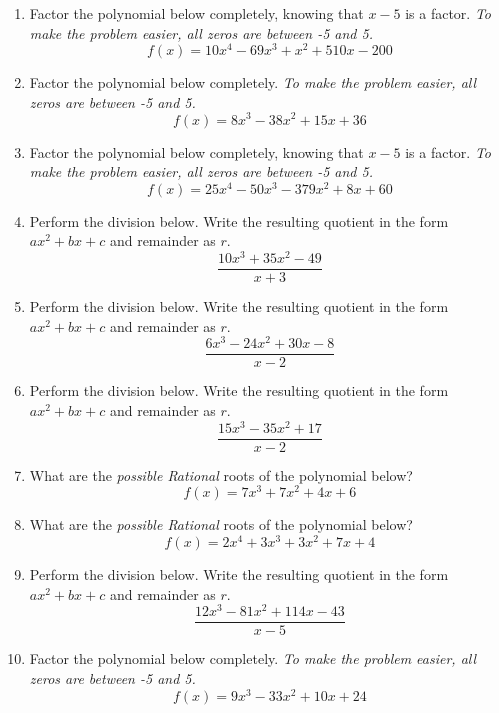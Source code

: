 \documentclass[14pt]{extbook}
\begin{document}
\begin{enumerate}
\item{
Factor the polynomial below completely, knowing that $x -5$ is a factor. \textit{To make the problem easier, all zeros are between -5 and 5.}\[ f(x) = 10x^{4} -69 x^{3} + x^{2} +510 x -200 \]} \newpage
\item{
Factor the polynomial below completely. \textit{To make the problem easier, all zeros are between -5 and 5.}\[ f(x) = 8x^{3} -38 x^{2} +15 x + 36 \]} \newpage
\item{
Factor the polynomial below completely, knowing that $x -5$ is a factor. \textit{To make the problem easier, all zeros are between -5 and 5.}\[ f(x) = 25x^{4} -50 x^{3} -379 x^{2} +8 x + 60 \]} \newpage
\item{
Perform the division below. Write the resulting quotient in the form $ax^2+bx+c$ and remainder as $r$.\[ \frac{10x^{3} +35 x^{2} -49}{x + 3} \]} \newpage
\item{
Perform the division below. Write the resulting quotient in the form $ax^2+bx+c$ and remainder as $r$.\[ \frac{6x^{3} -24 x^{2} +30 x -8}{x -2} \]} \newpage
\item{
Perform the division below. Write the resulting quotient in the form $ax^2+bx+c$ and remainder as $r$.\[ \frac{15x^{3} -35 x^{2} + 17}{x -2} \]} \newpage
\item{
What are the \textit{possible Rational} roots of the polynomial below?\[ f(x) = 7x^{3} +7 x^{2} +4 x + 6 \]} \newpage
\item{
What are the \textit{possible Rational} roots of the polynomial below?\[ f(x) = 2x^{4} +3 x^{3} +3 x^{2} +7 x + 4 \]} \newpage
\item{
Perform the division below. Write the resulting quotient in the form $ax^2+bx+c$ and remainder as $r$.\[ \frac{12x^{3} -81 x^{2} +114 x -43}{x -5} \]} \newpage
\item{
Factor the polynomial below completely. \textit{To make the problem easier, all zeros are between -5 and 5.}\[ f(x) = 9x^{3} -33 x^{2} +10 x + 24 \]} \newpage
\end{enumerate}
\end{document}
